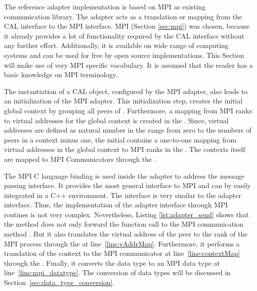 The reference adapter implementation is based on MPI as existing
communication library. The adapter acts as a translation or mapping
from the CAL interface to the MPI interface.  MPI (Section
\ref{sec:mpi}) was chosen, because it already provides a lot of
functionality required by the CAL interface without any further
effort. Additionally, it is available on wide range of computing systems
and can be used for free by open source implementations. This Section
will make use of very MPI specific vocabulary. It is assumed that the
reader has a basic knowledge on MPI terminology.

The instantiation of a CAL object, configured by the MPI adapter, also
leads to an initialization of the MPI adapter. This initialization
step, creates the initial global context by grouping all peers of
.  Furthermore, a mapping from MPI ranks to
virtual addresses for the global context is created in the
. Since, virtual addresses are defined as natural number
in the range from zero to the numbers of peers in a context minus one,
the initial  contains a one-to-one mapping from virtual
addresses in the global context to MPI ranks in the
. The contexts itself are mapped to MPI
Communicators through the .


The MPI C language binding is used inside the adapter to address the
message passing interface.  It provides the most general interface to
MPI and can by easily integrated in a C++ environment.  The interface
is very similar to the adapter interface. Thus, the implementation of
the adapter interface through MPI routines is not very
complex. Nevertheless, Listing \ref{lst:adapter_send} shows that the
 method does not only forward the function call to
the MPI communication method .  But it also translates
the virtual address  of the peer to the rank of the
MPI process through the  at line~\ref{line:vAddrMap}.
Furthermore, it performs a translation of the context to the MPI
communicator at line~\ref{line:contextMap} through the
. Finally, it converts the data type  to
an MPI data type at line~\ref{line:mpi_datatype}.  The conversion of
data types will be discussed in
Section~\ref{sec:data_type_conversion}.

